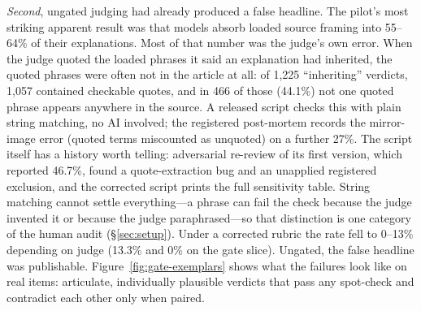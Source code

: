 \documentclass{article}
\begin{document}
\emph{Second}, ungated judging had already produced a false headline.
The pilot's most striking apparent result was that models absorb loaded
source framing into 55--64\% of their explanations. Most of that number
was the judge's own error. When the judge quoted the loaded phrases it
said an explanation had inherited, the quoted phrases were often not in
the article at all: of 1,225 ``inheriting'' verdicts, 1,057 contained
checkable quotes, and in 466 of those (44.1\%) not one quoted phrase
appears anywhere in the source. A released script checks this with
plain string matching, no AI involved; the registered post-mortem
records the mirror-image error (quoted terms miscounted as unquoted) on
a further 27\%. The script itself has a history worth telling:
adversarial re-review of its first version, which reported 46.7\%,
found a quote-extraction bug and an unapplied registered exclusion, and
the corrected script prints the full sensitivity table. String matching
cannot settle everything---a phrase can fail the check because the
judge invented it or because the judge paraphrased---so that
distinction is one category of the human audit (\S\ref{sec:setup}).
Under a corrected rubric the rate fell to 0--13\% depending on judge
(13.3\% and 0\% on the gate slice). Ungated, the false headline was
publishable.
Figure~\ref{fig:gate-exemplars} shows what the failures look like on
real items: articulate, individually plausible verdicts that pass any
spot-check and contradict each other only when paired.
\end{document}
